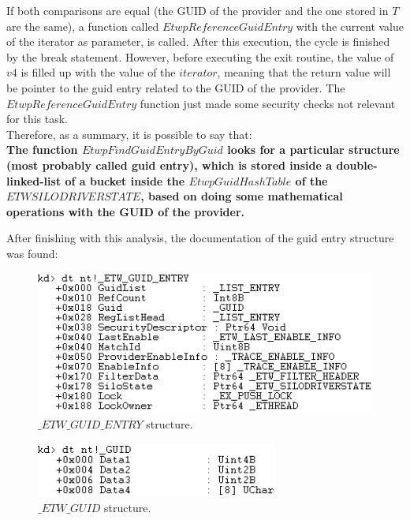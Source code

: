   If both comparisons are equal (the GUID of the provider and the one stored in $T$ are the same), a function called $EtwpReferenceGuidEntry$ with the current value of the iterator as parameter, is called. After this execution, the cycle is finished by the break statement. However, before executing the exit routine, the value of $v4$ is filled up with the value of the $iterator$, meaning that the return value will be pointer to the guid entry related to the GUID of the provider. The $EtwpReferenceGuidEntry$ function just made some security checks not relevant for this task. \\

  Therefore, as a summary, it is possible to say that:\\
  {\bfseries The function $EtwpFindGuidEntryByGuid$ looks for a particular structure (most probably called guid entry), which is stored inside a double-linked-list of a bucket inside the $EtwpGuidHashTable$ of the $ETWSILODRIVERSTATE$, based on doing some mathematical operations with the GUID of the provider.}

  After finishing with this analysis, the documentation of the guid entry structure was found: 

  \begin{centering}
    \begin{figure}[H]
      \includegraphics[width=12cm]{images/etwguidentrylayout.png}
      \caption[]{$\_ETW\_GUID\_ENTRY$ structure.}
      \label{fig:etwguidentry}
    \end{figure}
  \end{centering}

  \begin{centering}
    \begin{figure}[H]
      \includegraphics[width=8cm]{images/etwguidlayout.png}
      \caption[]{$\_ETW\_GUID$ structure.}
      \label{fig:guidlayout}
    \end{figure}
  \end{centering}
  
